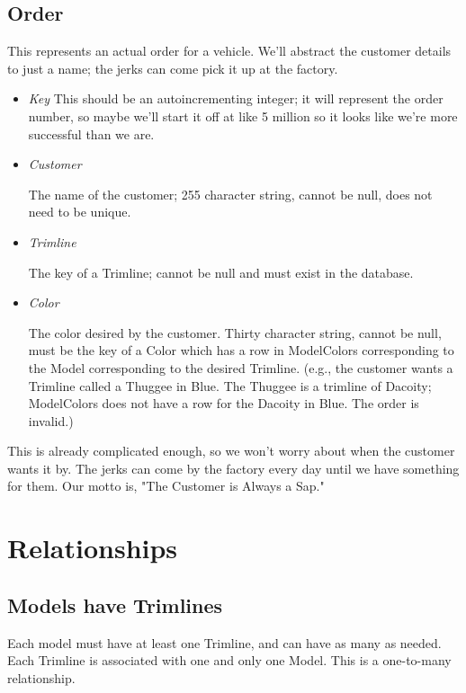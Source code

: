 \documentclass{article}
\begin{document}
\subsection*{Order}

This represents an actual order for a vehicle.  We'll abstract the customer details to just a name; the jerks can come pick it up at the factory.

\begin{itemize}

\item \emph{Key}
	This should be an autoincrementing integer; it will represent the order number, so maybe we'll start it off at like 5 million so it looks like we're more successful than we are.

\item \emph{Customer}

	The name of the customer; 255 character string, cannot be null, does not need to be unique.
	
\item \emph{Trimline}
	
	The key of a Trimline; cannot be null and must exist in the database.
	
\item \emph{Color}

	The color desired by the customer.  Thirty character string, cannot be null, must be the key of a Color which has a row in ModelColors corresponding to the Model corresponding to the desired Trimline.  (e.g., the customer wants a Trimline called a Thuggee in Blue.  The Thuggee is a trimline of Dacoity; ModelColors does not have a row for the Dacoity in Blue.  The order is invalid.)
	
\end{itemize}

This is already complicated enough, so we won't worry about when the customer wants it by.  The jerks can come by the factory every day until we have something for them.  Our motto is, "The Customer is Always a Sap."

\section*{Relationships}

\subsection*{Models have Trimlines}

Each model must have at least one Trimline, and can have as many as needed.  Each Trimline is associated with one and only one Model. This is a one-to-many relationship.
\end{document}
